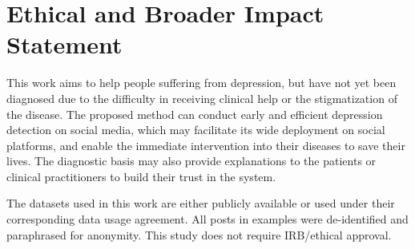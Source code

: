 \section{Ethical and Broader Impact Statement}

This work aims to help people suffering from depression, but have not yet been diagnosed due to the difficulty in receiving clinical help or the stigmatization of the disease. The proposed method can conduct early and efficient depression detection on social media, which may facilitate its wide deployment on social platforms, and enable the immediate intervention into their diseases to save their lives. The diagnostic basis may also provide explanations to the patients or clinical practitioners to build their trust in the system.

The datasets used in this work are either publicly available or used under their corresponding data usage agreement. All posts in examples were de-identified and paraphrased for anonymity. This study does not require IRB/ethical approval. 
